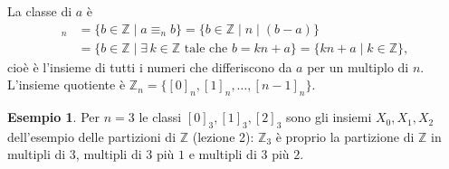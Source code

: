 \documentclass[11pt,a4paper]{article}
\theoremstyle{definition}
\newtheorem*{esempio}{Esempio}
\begin{document}
La classe di $a$ è
\begin{align*}
[a]_n &= \{b \in \mathbb{Z} \mid a \equiv_n b\}
       = \{b \in \mathbb{Z} \mid n \mid (b - a)\} \\
      &= \{b \in \mathbb{Z} \mid \exists\, k \in \mathbb{Z} \text{ tale
         che } b = kn + a\}
       = \{kn + a \mid k \in \mathbb{Z}\},
\end{align*}
cioè è l'insieme di tutti i numeri che differiscono da $a$ per un multiplo
di $n$. L'insieme quotiente è
$\mathbb{Z}_n = \{[0]_n, [1]_n, \dots, [n-1]_n\}$.

\begin{esempio}
Per $n = 3$ le classi $[0]_3, [1]_3, [2]_3$ sono gli insiemi $X_0, X_1,
X_2$ dell'esempio delle partizioni di $\mathbb{Z}$ (lezione 2): $\mathbb{Z}_3$ è proprio la partizione
di $\mathbb{Z}$ in multipli di $3$, multipli di $3$ più $1$ e multipli di
$3$ più $2$.
\end{esempio}
\end{document}
